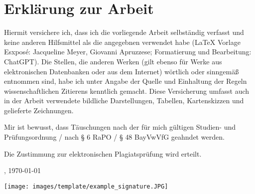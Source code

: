 \newpage 

\section*{Erklärung zur Arbeit}
\label{sec:authorship}


\noindent Hiermit versichere ich, dass ich die vorliegende Arbeit selbständig verfasst und keine anderen Hilfsmittel als die angegebnen verwendet habe (LaTeX Vorlage Esxposé: Jacqueline Meyer, Giovanni Apruzzese; Formatierung und Bearbeitung: ChatGPT). Die Stellen, die anderen Werken (gilt ebenso für Werke aus elektronischen Datenbanken oder aus dem Internet) wörtlich oder sinngemäß entnommen sind, habe ich unter Angabe der Quelle und Einhaltung der Regeln wissenschaftlichen Zitierens kenntlich gemacht. Diese Versicherung umfasst auch in der Arbeit verwendete bildliche Darstellungen, Tabellen, Kartenskizzen und gelieferte Zeichnungen.

\noindent Mir ist bewusst, dass Täuschungen nach der für mich gültigen Studien- und Prüfungsordnung / nach § 6 RaPO / § 48 BayVwVfG geahndet werden.

\noindent Die Zustimmung zur elektronischen Plagiatsprüfung wird erteilt.


\vspace{1cm}

\location, \today \hspace{0.35\linewidth}\parbox{0.3\linewidth}{\authorname}

\begin{center}
{\texttt{[image: images/template/example\_signature.JPG]}}
\end{center}